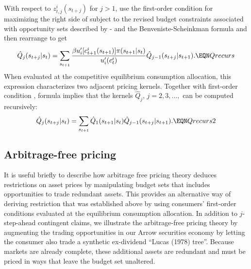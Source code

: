 With respect to $z^i_{t,j}( s_{t+j})$ for $j>1$,
use the first-order condition for maximizing the right side of   subject to 
the revised budget constraints associated with opportunity sets described by
- 
and the Benveniste-Scheinkman formula and then rearrange to get
$$ \hat Q_j( s_{t+j} | s_t ) = \sum_{s_{t+1}}
   {\beta u'_i[c^i_{t+1}(s_{t+1})] \pi(s_{t+1} | s_t) \over u'_i(c_t^i) }
   \hat Q_{j-1}( s_{t+j} | s_{t+1} ).           \EQN Qrecurs $$
When evaluated at the competitive equilibrium
consumption allocation, this expression characterizes two adjacent pricing
kernels. Together with first-order
condition , formula   implies that the
kernels $\hat Q_j$, $j = 2, 3, \ldots,$ can be computed recursively:
$$ \hat Q_j( s_{t+j} | s_t) = \sum_{s_{t+1}} 
            \hat Q_1(s_{t+1} | s_t)
            \hat Q_{j-1}( s_{t+j} | s_{t+1}). \EQN Qrecurs2 $$




\subsection{Arbitrage-free pricing}
It is useful briefly to describe how arbitrage free pricing theory
%
 deduces restrictions on asset
prices by manipulating  budget sets that includes opportunities to trade  redundant
assets.
This provides an alternative way of deriving restriction
 that was established above by using consumers'
first-order conditions evaluated at the equilibrium consumption
allocation. In addition to $j$-step-ahead contingent claims, we
illustrate the arbitrage-free pricing theory by augmenting the trading
opportunities in our Arrow securities economy by letting the
consumer also trade  a synthetic ex-dividend 
``Lucas (1978) tree''.
%
 Because markets
are already complete, these additional assets are redundant and must be priced in ways that leave the budget set
unaltered.


